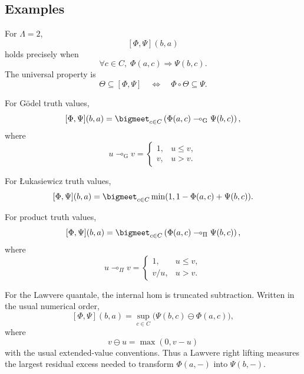 \subsection{Examples}
\label{subsec:right-liftings-examples}

\begin{example}
\label{ex:right-lifting-crisp}
For \(\Lambda=2\),
\[
    [\Phi,\Psi](b,a)
\]
holds precisely when
\[
    \forall c\in C,\;
    \Phi(a,c)\Rightarrow \Psi(b,c).
\]
The universal property is
\[
    \Theta\subseteq[\Phi,\Psi]
    \quad\Longleftrightarrow\quad
    \Phi\circ\Theta\subseteq\Psi.
\]
\end{example}

\begin{example}
\label{ex:right-lifting-godel}
For G\"odel truth values,
\[
    [\Phi,\Psi](b,a)
    =
    \bigmeet_{c\in C}
    \left(
        \Phi(a,c)\multimap_{\mathrm G}\Psi(b,c)
    \right),
\]
where
\[
    u\multimap_{\mathrm G}v
    =
    \begin{cases}
    1,&u\leq v,\\
    v,&u>v.
    \end{cases}
\]
\end{example}

\begin{example}
\label{ex:right-lifting-lukasiewicz}
For {\L}ukasiewicz truth values,
\[
    [\Phi,\Psi](b,a)
    =
    \bigmeet_{c\in C}
    \min(1,1-\Phi(a,c)+\Psi(b,c)).
\]
\end{example}

\begin{example}
\label{ex:right-lifting-product}
For product truth values,
\[
    [\Phi,\Psi](b,a)
    =
    \bigmeet_{c\in C}
    \left(
        \Phi(a,c)\multimap_\Pi\Psi(b,c)
    \right),
\]
where
\[
    u\multimap_\Pi v
    =
    \begin{cases}
    1,&u\leq v,\\
    v/u,&u>v.
    \end{cases}
\]
\end{example}

\begin{example}
\label{ex:right-lifting-lawvere}
For the Lawvere quantale, the internal hom is truncated subtraction. Written in
the usual numerical order,
\[
    [\Phi,\Psi](b,a)
    =
    \sup_{c\in C}
    \bigl(\Psi(b,c)\ominus \Phi(a,c)\bigr),
\]
where
\[
    v\ominus u=\max(0,v-u)
\]
with the usual extended-value conventions. Thus a Lawvere right lifting measures
the largest residual excess needed to transform \(\Phi(a,-)\) into
\(\Psi(b,-)\).
\end{example}

